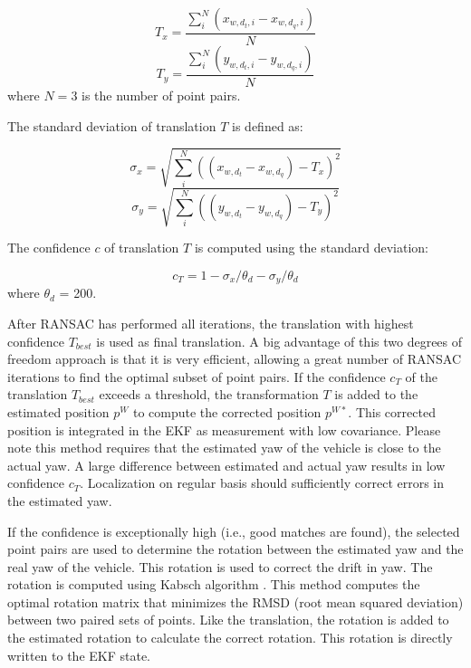 \begin{equation}
T_x = \frac{\sum_{i}^{N} (x_{w, d_t, i} - x_{w, d_q, i})}{N}
\end{equation}
\begin{equation}
T_y = \frac{\sum_{i}^{N} (y_{w, d_t ,i} - y_{w, d_q, i})}{N}
\end{equation}
where $N = 3$ is the number of point pairs.

The standard deviation of translation  $T$ is defined as:

\begin{equation}
\sigma_x = \sqrt{  \sum_{i}^{N}   ((x_{w, d_t} - x_{w, d_q}) - T_x)^{2}   }
\end{equation}
\begin{equation}
\sigma_y = \sqrt{  \sum_{i}^{N}   ((y_{w, d_t} - y_{w, d_q}) - T_y)^{2}   }
\end{equation}

The confidence $c$ of translation $T$ is computed using the standard deviation:

\begin{equation}
c_{T} = 1 -   \sigma_x / \theta_{d} -  \sigma_y / \theta_{d}
\end{equation}
where $\theta_d$ = 200.

After RANSAC has performed all iterations, the translation with highest confidence $T_{best}$ is used as final translation.
A big advantage of this two degrees of freedom approach is that it is very efficient, allowing a great number of RANSAC iterations to find the optimal subset of point pairs.
If the confidence $c_{T}$ of the translation $T_{best}$ exceeds a threshold, the transformation $T$ is added to the estimated position $p^W$ to compute the corrected position $p^{W*}$. This corrected position is integrated in the EKF as measurement with low covariance.
Please note this method requires that the estimated yaw of the vehicle is close to the actual yaw.
A large difference between estimated and actual yaw results in low confidence $c_T$.
Localization on regular basis should sufficiently correct errors in the estimated yaw.

If the confidence is exceptionally high (i.e., good matches are found), the selected point pairs are used to determine the rotation between the estimated yaw and the real yaw of the vehicle. This rotation is used to correct the drift in yaw.
The rotation is computed using Kabsch algorithm \cite{Kabsch:a12999}.
This method computes the optimal rotation matrix that minimizes the RMSD (root mean squared deviation) between two paired sets of points.
Like the translation, the rotation is added to the estimated rotation to calculate the correct rotation. This rotation is directly written to the EKF state.

